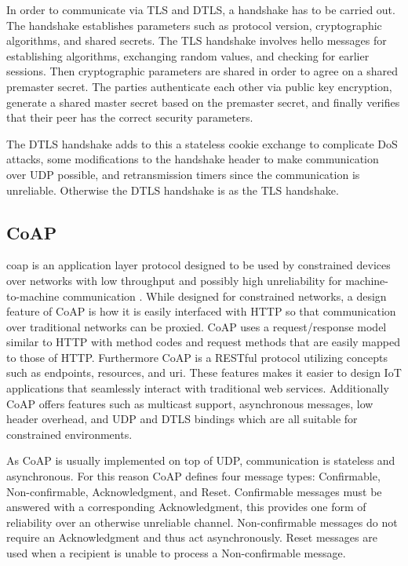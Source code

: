 \documentclass[0-thesis.tex]{subfiles}
\begin{document}
In order to communicate via TLS and DTLS, a handshake has to be carried out. The handshake
establishes parameters such as protocol version, cryptographic algorithms, and shared
secrets. The TLS handshake involves hello messages for establishing algorithms, exchanging
random values, and checking for earlier sessions. Then cryptographic parameters are shared
in order to agree on a shared premaster secret. The parties authenticate each other via
public key encryption, generate a shared master secret based on the premaster secret, and
finally verifies that their peer has the correct security parameters.

The DTLS handshake adds to this a stateless cookie exchange to complicate DoS attacks,
some modifications to the handshake header to make communication over UDP possible, and
retransmission timers since the communication is unreliable. Otherwise the DTLS handshake
is as the TLS handshake.

\subsection{CoAP}
\label{ssec:coap}
\acrfull{coap} is an application layer protocol designed to be used by constrained devices
over networks with low throughput and possibly high unreliability for machine-to-machine
communication \parencite{rfc7252}. While designed for constrained networks, a design
feature of CoAP is how it is easily interfaced with HTTP so that communication over
traditional networks can be proxied. CoAP uses a request/response model similar to HTTP
with method codes and request methods that are easily mapped to those of HTTP. Furthermore
CoAP is a RESTful protocol utilizing concepts such as endpoints, resources, and \gls{uri}.
These features makes it easier to design IoT applications that seamlessly interact with
traditional web services. Additionally CoAP offers features such as multicast support,
asynchronous messages, low header overhead, and UDP and DTLS bindings which are all
suitable for constrained environments.

As CoAP is usually implemented on top of UDP, communication is stateless and asynchronous.
For this reason CoAP defines four message types: Confirmable, Non-confirmable,
Acknowledgment, and Reset. Confirmable messages must be answered with a corresponding
Acknowledgment, this provides one form of reliability over an otherwise unreliable
channel. Non-confirmable messages do not require an Acknowledgment and thus act
asynchronously. Reset messages are used when a recipient is unable to process a
Non-confirmable message.
\end{document}
